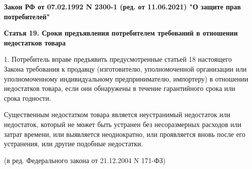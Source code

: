 \textbf{{\Large Закон РФ от 07.02.1992 N 2300-1 (ред. от 11.06.2021) "О защите прав потребителей"}}

\textbf{Статья 19. Сроки предъявления потребителем требований в отношении недостатков товара}


1. Потребитель вправе предъявить предусмотренные статьей 18 настоящего Закона требования к продавцу (изготовителю, уполномоченной организации или уполномоченному индивидуальному предпринимателю, импортеру) в отношении недостатков товара, если они обнаружены в течение гарантийного срока или срока годности.



Существенным недостатком товара является неустранимый недостаток или недостаток, который не может быть устранен без несоразмерных расходов или затрат времени, или выявляется неоднократно, или проявляется вновь после его устранения, или другие подобные недостатки.


(в ред. Федерального закона от 21.12.2004 N 171-ФЗ)